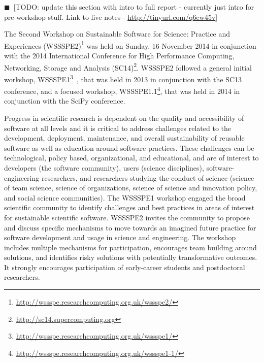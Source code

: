 \documentclass[11pt, oneside]{amsart}
\newcommand{\todo}[1]{{\color{blue}$\blacksquare$~\textsf{[TODO: #1]}}}
\newcommand{\katznote}[1]{ {\textcolor{magenta}    { ***Dan:      #1 }}}
\newcommand{\gabnote}[1]{ {\textcolor{cyan}    { ***Gabrielle:     #1 }}}
\newcommand{\nchnote}[1]{  {\textcolor{orange}      { ***Neil: #1 }}}
\newcommand{\manishnote}[1]{  {\textcolor{violet}     { ***Manish: #1 }}}
\newcommand{\davidnote}[1]{  {\textcolor{darkgreen}      { ***David: #1 }}}
\begin{document}
%
%
%
%

\todo{update this section with intro to full report - currently just intro for pre-workshop stuff. Link to live notes -
\url{http://tinyurl.com/q6ew45v}}

The Second Workshop on Sustainable Software for Science: Practice and
Experiences
(WSSSPE2)\footnote{\url{http://wssspe.researchcomputing.org.uk/wssspe2/}} was
held on Sunday, 16 November 2014 in conjunction with the 2014 International
Conference for High Performance Computing, Networking, Storage and Analysis
(SC14)\footnote{\url{http://sc14.supercomputing.org}}.
WSSSPE2 followed a general initial workshop,
WSSSPE1\footnote{\url{http://wssspe.researchcomputing.org.uk/wssspe1/}}~\cite{WSSSPE1-pre-report,WSSSPE1},
that was held in 2013 in conjunction with the SC13 conference, and a focused
workshop,
WSSSPE1.1\footnote{\url{http://wssspe.researchcomputing.org.uk/wssspe1-1/}},
that was held in 2014 in conjunction with the SciPy conference.

Progress in scientific research is dependent on the quality and accessibility of
software at all levels and it is critical to address challenges related to the
development, deployment, maintenance, and overall sustainability of reusable
software as well as education around software practices. These challenges can be
technological, policy based, organizational, and educational, and are of
interest to developers (the software community), users (science disciplines),
software-engineering researchers, and researchers studying the conduct of
science (science of team science, science of organizations, science of science
and innovation policy, and social science communities). The WSSSPE1 workshop
engaged the broad scientific community to identify challenges and best practices
in areas of interest for sustainable scientific software. WSSSPE2 invites the
community to propose and discuss specific mechanisms to move towards an imagined
future practice for software development and usage in science and engineering.
The workshop includes multiple mechanisms for participation, encourages team
building around solutions, and identifies risky solutions with potentially
transformative outcomes. It strongly encourages participation of early-career
students and postdoctoral researchers.
\end{document}
